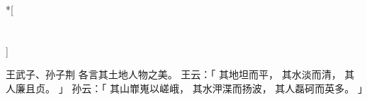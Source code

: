 
\switchcolumn[0]*[\section{}]

王武子、孙子荆
各言其土地人物之美。
王云：「
    其地坦而平，
    其水淡而清，
    其人廉且贞。
」
孙云：「
    其山㠑嵬以嵯峨，
    其水㳌渫而扬波，
    其人磊砢而英多。
」

\switchcolumn



